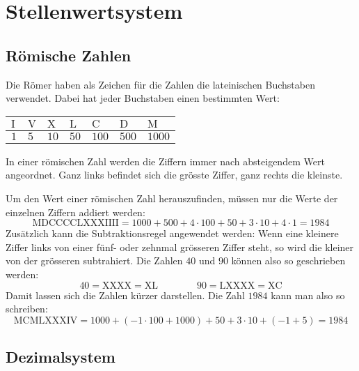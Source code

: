 \newpage
\section{Stellenwertsystem}

\subsection{Römische Zahlen}

Die Römer haben als Zeichen für die Zahlen die lateinischen Buchstaben verwendet. Dabei hat jeder Buchstaben einen bestimmten Wert:

\begin{center}
  \begin{tabularx}{0.9\textwidth}{CCCCCCC}
  \toprule
   $\text{I}$ & $\text{V}$ & $\text{X}$ & $\text{L}$ & $\text{C}$ &  $\text{D}$ & $\text{M}$ \\
  \midrule
    $1$        & $5$        & $10$       & $50$       & $100$      & $500$      & $1000$ \\
  \bottomrule
  \end{tabularx}
\end{center}

In einer römischen Zahl werden die Ziffern immer nach absteigendem Wert angeordnet. Ganz links befindet sich die grösste Ziffer, ganz rechts die kleinste.

Um den Wert einer römischen Zahl herauszufinden, müssen nur die Werte der einzelnen Ziffern addiert werden:
\[
  \text{MDCCCCLXXXIIII} = 1000 + 500 + 4\cdot 100 + 50 + 3\cdot 10 + 4 \cdot 1 = 1984
\]
Zusätzlich kann die Subtraktionsregel angewendet werden: Wenn eine kleinere Ziffer links von einer fünf- oder zehnmal grösseren Ziffer steht, so wird die kleiner von der grösseren subtrahiert. Die Zahlen $40$ und $90$ können also so geschrieben werden:
\[
  40 = \text{XXXX} = \text{XL} \qquad\qquad 90 = \text{LXXXX} = \text{XC}
\]
Damit lassen sich die Zahlen kürzer darstellen. Die Zahl $1984$ kann man also so schreiben:
\[
  \text{MCMLXXXIV} = 1000 + (-1\cdot 100 + 1000) + 50 + 3\cdot 10 + (-1 + 5) = 1984
\]

\subsection{Dezimalsystem}

